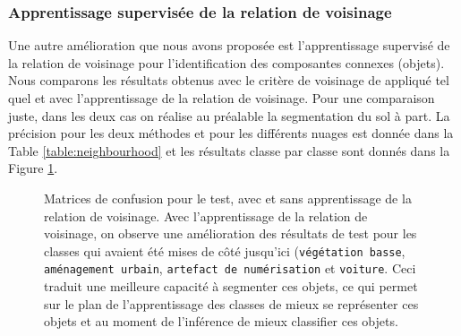 \documentclass[a4paper, onecolumn, 11pt]{article}
\begin{document}
\subsubsection{Apprentissage supervisée de la relation de voisinage}

Une autre amélioration que nous avons proposée est l'apprentissage supervisé de la relation de voisinage pour l'identification des composantes connexes (objets). Nous comparons les résultats obtenus avec le critère de voisinage de \cite{aka_article} appliqué tel quel et avec l'apprentissage de la relation de voisinage. Pour une comparaison juste, dans les deux cas on réalise au préalable la segmentation du sol à part. La précision pour les deux méthodes et pour les différents nuages est donnée dans la Table \ref{table:neighbourhood} et les résultats classe par classe sont donnés dans la Figure \ref{fig:neighbourhood}.

\begin{figure}[p]
    \centering
    \qquad
    \caption{Matrices de confusion pour le test, avec et sans apprentissage de la relation de voisinage. Avec l'apprentissage de la relation de voisinage, on observe une amélioration des résultats de test pour les classes qui avaient été mises de côté jusqu'ici (\texttt{végétation basse}, \texttt{aménagement urbain}, \texttt{artefact de numérisation} et \texttt{voiture}. Ceci traduit une meilleure capacité à segmenter ces objets, ce qui permet sur le plan de l'apprentissage des classes de mieux se représenter ces objets et au moment de l'inférence de mieux classifier ces objets.}
    \label{fig:neighbourhood}
\end{figure}
\end{document}
